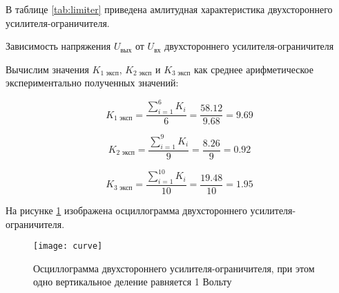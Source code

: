 В таблице \ref{tab:limiter} приведена амлитудная характеристика двухстороннего усилителя-ограничителя.

\begin{table}[H]
\begin{center}
	\caption{Зависимость напряжения $U_\text{вых}$ от $U_\text{вх}$ двухстороннего усилителя-ограничителя}
	\label{tab:limiter}
	\def\tabcolsep{20pt}
	\def\arraystretch{1.23}
	\fontsize{13}{14}\selectfont
\end{center}
\end{table}

Вычислим значения $K_{1 \text{ эксп}}$, $K_{2 \text{ эксп}}$ и $K_{3 \text{ эксп}}$ как среднее арифметическое экспериментально полученных значений:

\begin{displaymath}
	K_{1 \text{ эксп}} = \frac{\sum_{i=1}^{6}K_i}{6} = \frac{58.12}{9.68} = 9.69
\end{displaymath}

\begin{displaymath}
	K_{2 \text{ эксп}} = \frac{\sum_{i=1}^{9}K_i}{9} = \frac{8.26}{9} = 0.92
\end{displaymath}

\begin{displaymath}
	K_{3 \text{ эксп}} = \frac{\sum_{i=1}^{10}K_i}{10} = \frac{19.48}{10} = 1.95
\end{displaymath}

На рисунке \ref{fig:oscillogram} изображена осциллограмма двухстороннего усилителя-ограничителя.

\begin{figure}[H]
\begin{center}
	\texttt{[image: curve]}
	\caption{Осциллограмма двухстороннего усилителя-ограничителя, при этом одно вертикальное деление равняется 1 Вольту}
	\label{fig:oscillogram}
\end{center}
\end{figure}

